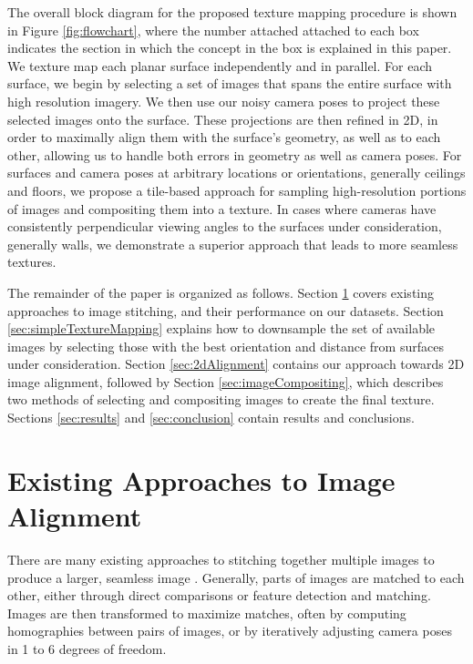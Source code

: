 \documentclass[]{spie}  %
\begin{document}
The overall block diagram for the proposed texture mapping procedure
is shown in Figure \ref{fig:flowchart}, where the number attached
attached to each box indicates the section in which the concept in the
box is explained in this paper. We texture map each planar surface
independently and in parallel. For each surface, we begin by selecting
a set of images that spans the entire surface with high resolution
imagery. We then use our noisy camera poses to project these selected
images onto the surface. These projections are then refined in 2D, in
order to maximally align them with the surface's geometry, as well as
to each other, allowing us to handle both errors in geometry as well
as camera poses. For surfaces and camera poses at arbitrary locations
or orientations, generally ceilings and floors, we propose a
tile-based approach for sampling high-resolution portions of images
and compositing them into a texture. In cases where cameras have
consistently perpendicular viewing angles to the surfaces under
consideration, generally walls, we demonstrate a superior approach
that leads to more seamless textures.

The remainder of the paper is organized as follows. Section
\ref{sec:existingApproaches} covers existing approaches to image
stitching, and their performance on our datasets. Section
\ref{sec:simpleTextureMapping} explains how to downsample the set of
available images by selecting those with the best orientation and
distance from surfaces under consideration. Section
\ref{sec:2dAlignment} contains our approach towards 2D image
alignment, followed by Section \ref{sec:imageCompositing}, which
describes two methods of selecting and compositing images to create
the final texture. Sections \ref{sec:results} and \ref{sec:conclusion}
contain results and conclusions.



\section{Existing Approaches to Image Alignment}
\label{sec:existingApproaches}
There are many existing approaches to stitching together multiple
images to produce a larger, seamless image \cite{szeliski2006image,
  agarwalapanoramas, wangmultipleviews, coorg1997matching,
  debevechybrid, bernardinimultiplescans}. Generally, parts of images
are matched to each other, either through direct comparisons or
feature detection and matching. Images are then transformed to
maximize matches, often by computing homographies between pairs of
images, or by iteratively adjusting camera poses in 1 to 6 degrees of
freedom.
\end{document}
